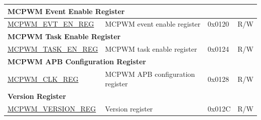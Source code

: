 \begin{longtable}{ | p{6cm} | p{7.2cm} | p{1.3cm} | p{1cm} | }
\multicolumn{4}{|l|}{\textbf{MCPWM Event Enable Register}} \\ \hline
\hyperref[regdesc:MCPWMEVTENREG]{MCPWM\_EVT\_EN\_REG} & MCPWM event enable register & 0x0120 & R/W \\ \hline

\multicolumn{4}{|l|}{\textbf{MCPWM Task Enable Register}} \\ \hline
\hyperref[regdesc:MCPWMTASKENREG]{MCPWM\_TASK\_EN\_REG} & MCPWM task enable register & 0x0124 & R/W \\ \hline

\multicolumn{4}{|l|}{\textbf{MCPWM APB Configuration Register}} \\ \hline
\hyperref[regdesc:MCPWMCLKREG]{MCPWM\_CLK\_REG} & MCPWM APB configuration register & 0x0128 & R/W \\ \hline

\multicolumn{4}{|l|}{\textbf{Version Register}} \\ \hline
\hyperref[regdesc:MCPWMVERSIONREG]{MCPWM\_VERSION\_REG} & Version register & 0x012C & R/W \\ \hline
\end{longtable}
